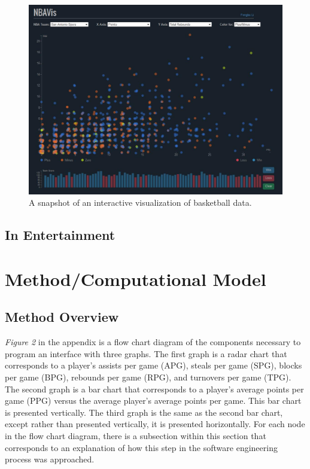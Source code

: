 \documentclass[journal]{vgtc}                %
\begin{document}
\begin{figure}[h]
\caption{A snapshot of an interactive visualization of basketball data.}
\includegraphics[width=\linewidth]{georgiatech.jpg}
\end{figure}


\subsection{In Entertainment}



\section{Method/Computational Model}
\subsection{Method Overview}
\emph{Figure 2} in the appendix is a flow chart diagram of the components necessary to program an interface with three graphs. The first graph is a radar chart that corresponds to a player's assists per game (APG), steals per game (SPG), blocks per game (BPG), rebounds per game (RPG), and turnovers per game (TPG). The second graph is a bar chart that corresponds to a player's average points per game (PPG) versus the average player's average points per game. This bar chart is presented vertically. The third graph is the same as the second bar chart, except rather than presented vertically, it is presented horizontally. For each node in the flow chart diagram, there is a subsection within this section that corresponds to an explanation of how this step in the software engineering process was approached. 
\end{document}
